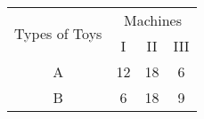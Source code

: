 \begin{center}
\begin{tabular}{|c|c|c|c|}
\hline
\multirow{2}{*}{Types of Toys}	&\multicolumn{3}{c|}{Machines}\\
\cline{2-4}
	&I	&II	&III\\ \hline
A	&12	&18	&6\\ \hline
B	&6	&18	&9\\ \hline
\end{tabular}
\end{center}
